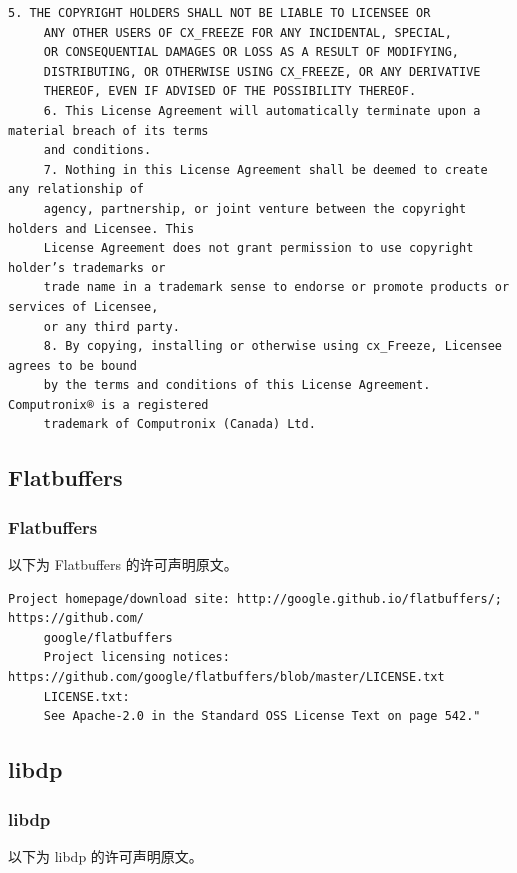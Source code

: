 \begin{lstlisting}[basicstyle=\ttfamily\footnotesize,breaklines=true]
     5. THE COPYRIGHT HOLDERS SHALL NOT BE LIABLE TO LICENSEE OR
     ANY OTHER USERS OF CX_FREEZE FOR ANY INCIDENTAL, SPECIAL,
     OR CONSEQUENTIAL DAMAGES OR LOSS AS A RESULT OF MODIFYING,
     DISTRIBUTING, OR OTHERWISE USING CX_FREEZE, OR ANY DERIVATIVE
     THEREOF, EVEN IF ADVISED OF THE POSSIBILITY THEREOF.
     6. This License Agreement will automatically terminate upon a material breach of its terms
     and conditions.
     7. Nothing in this License Agreement shall be deemed to create any relationship of
     agency, partnership, or joint venture between the copyright holders and Licensee. This
     License Agreement does not grant permission to use copyright holder’s trademarks or
     trade name in a trademark sense to endorse or promote products or services of Licensee,
     or any third party.
     8. By copying, installing or otherwise using cx_Freeze, Licensee agrees to be bound
     by the terms and conditions of this License Agreement. Computronix® is a registered
     trademark of Computronix (Canada) Ltd.
\end{lstlisting}

\subsection{Flatbuffers}
\subsubsection*{Flatbuffers}

以下为 Flatbuffers 的许可声明原文。

\begin{lstlisting}[basicstyle=\ttfamily\footnotesize,breaklines=true]
     Project homepage/download site: http://google.github.io/flatbuffers/; https://github.com/
     google/flatbuffers
     Project licensing notices: https://github.com/google/flatbuffers/blob/master/LICENSE.txt
     LICENSE.txt:
     See Apache-2.0 in the Standard OSS License Text on page 542."
\end{lstlisting}

\subsection{libdp}
\subsubsection*{libdp}

以下为 libdp 的许可声明原文。

